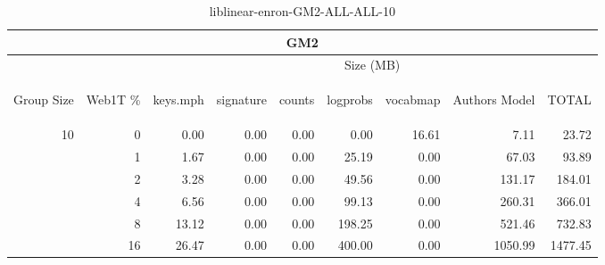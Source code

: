 \begin{center}
\begin{table}[htbp] 
 \begin{center}
\begin{tabular}{ | r | r | r | r | r | r | r | r | r |}
\hline
\multicolumn{9}{|c|}{GM2}\\
\hline
 & & \multicolumn{7}{|c|}{Size (MB)}\\ \cline{3-9}
\begin{sideways}Group Size\end{sideways} & \begin{sideways}Web1T \% \end{sideways} & \begin{sideways}keys.mph\end{sideways} & \begin{sideways}signature\end{sideways} & \begin{sideways}counts\end{sideways} & \begin{sideways}logprobs\end{sideways} & \begin{sideways}vocabmap\end{sideways} & \begin{sideways}Authors Model \end{sideways} & \begin{sideways}TOTAL\end{sideways}\\
\hline
\multirow{5}{*}{10}
 & 0 & 0.00 & 0.00 & 0.00 & 0.00 & 16.61 & 7.11 & 23.72\\ \cline{2-9}
 & 1 & 1.67 & 0.00 & 0.00 & 25.19 & 0.00 & 67.03 & 93.89\\ \cline{2-9}
 & 2 & 3.28 & 0.00 & 0.00 & 49.56 & 0.00 & 131.17 & 184.01\\ \cline{2-9}
 & 4 & 6.56 & 0.00 & 0.00 & 99.13 & 0.00 & 260.31 & 366.01\\ \cline{2-9}
 & 8 & 13.12 & 0.00 & 0.00 & 198.25 & 0.00 & 521.46 & 732.83\\ \cline{2-9}
 & 16 & 26.47 & 0.00 & 0.00 & 400.00 & 0.00 & 1050.99 & 1477.45\\ \cline{2-9}
\hline
\end{tabular}
\caption{liblinear-enron-GM2-ALL-ALL-10}
\label{table:liblinear-enron-GM2-ALL-ALL-10}
\end{center}
 \end{table}
\end{center}

